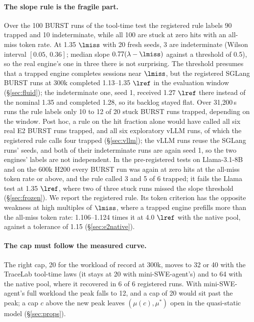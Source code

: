 \paragraph{The slope rule is the fragile part.} Over the 100 BURST runs of the tool-time test the registered rule labels 90 trapped and 10 indeterminate, while all 100 are stuck at zero hits with an all-miss token rate. At 1.35 $\lmiss$ with 20 fresh seeds, 3 are indeterminate (Wilson interval $[0.05,\,0.36]$; median slope $0.77(\lambda-\lmiss)$ against a threshold of 0.5), so the real engine's one in three there is not surprising. The threshold presumes that a trapped engine completes sessions near $\lmiss$, but the registered SGLang BURST runs at 300k completed 1.13--1.35 $\lref$ in the evaluation window (\S\ref{sec:fluid}); the indeterminate one, seed 1, received 1.27 $\lref$ there instead of the nominal 1.35 and completed 1.28, so its backlog stayed flat. Over 31,200\,s runs the rule labels only 10 to 12 of 20 stuck BURST runs trapped, depending on the window. Post hoc, a rule on the hit fraction alone would have called all six real E2 BURST runs trapped, and all six exploratory vLLM runs, of which the registered rule calls four trapped (\S\ref{sec:vllm}); the vLLM runs reuse the SGLang runs' seeds, and both of their indeterminate runs are again seed 1, so the two engines' labels are not independent. In the pre-registered tests on Llama-3.1-8B and on the 600k H200 every BURST run was again at zero hits at the all-miss token rate or above, and the rule called 3 and 5 of 6 trapped; it fails the Llama test at 1.35 $\lref$, where two of three stuck runs missed the slope threshold (\S\ref{sec:frozen}). We report the registered rule. Its token criterion has the opposite weakness at high multiples of $\lmiss$, where a trapped engine prefills more than the all-miss token rate: 1.106--1.124 times it at 4.0 $\lref$ with the native pool, against a tolerance of 1.15 (\S\ref{sec:e2native}).

\paragraph{The cap must follow the measured curve.} The right cap, 20 for the workload of record at 300k, moves to 32 or 40 with the TraceLab tool-time laws (it stays at 20 with mini-SWE-agent's) and to 64 with the native pool, where it recovered in 6 of 6 registered runs. With mini-SWE-agent's full workload the peak falls to 12, and a cap of 20 would sit past the peak; a cap $c$ above the new peak leaves $(\mu(c),\mu^*)$ open in the quasi-static model (\S\ref{sec:props}).
